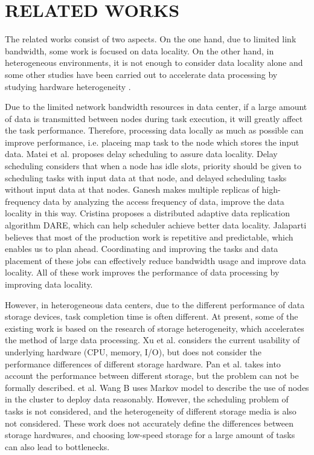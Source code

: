 \documentclass[conference]{IEEEtran}
\begin{document}
\section{RELATED WORKS}\label{RELATED_WORKS}
The related works consist of two aspects. On the one hand, due to limited link bandwidth, some work is focused on data locality. On the other hand, in heterogeneous environments, it is not enough to consider data locality alone and some other studies have been carried out to accelerate data processing by studying hardware heterogeneity \cite{b1}.

Due to the limited network bandwidth resources in data center, if a large amount of data is transmitted between nodes during task execution, it will greatly affect the task performance. Therefore, processing data locally as much as possible can improve performance, i.e. placeing map task to the node which stores the input data. Matei et al. \cite{b2} proposes delay scheduling to assure data locality. Delay scheduling considers that when a node has idle slots, priority should be given to scheduling tasks with input data at that node, and delayed scheduling tasks without input data at that nodes. Ganesh \cite{b3} makes multiple replicas of high-frequency data by analyzing the access frequency of data, improve the data locality in this way. Cristina \cite{b4} proposes a distributed adaptive data replication algorithm DARE, which can help scheduler achieve better data locality. Jalaparti \cite{b5} believes that most of the production work is repetitive and predictable, which enables us to plan ahead. Coordinating and improving the tasks and data placement of these jobs can effectively reduce bandwidth usage and improve data locality. All of these work improves the performance of data processing by improving data locality.

However, in heterogeneous data centers, due to the different performance of data storage devices, task completion time is often different. At present, some of the existing work is based on the research of storage heterogeneity, which accelerates the method of large data processing. Xu et al. \cite{b6} considers the current usability of underlying hardware (CPU, memory, I/O), but does not consider the performance differences of different storage hardware. Pan et al. \cite{b7} takes into account the performance between different storage, but the problem can not be formally described. et al. Wang B \cite{b8} uses Markov model to describe the use of nodes in the cluster to deploy data reasonably. However, the scheduling problem of tasks is not considered, and the heterogeneity of different storage media is also not considered. These work does not accurately define the differences between storage hardwares, and choosing low-speed storage for a large amount of tasks can also lead to bottlenecks.
\end{document}
